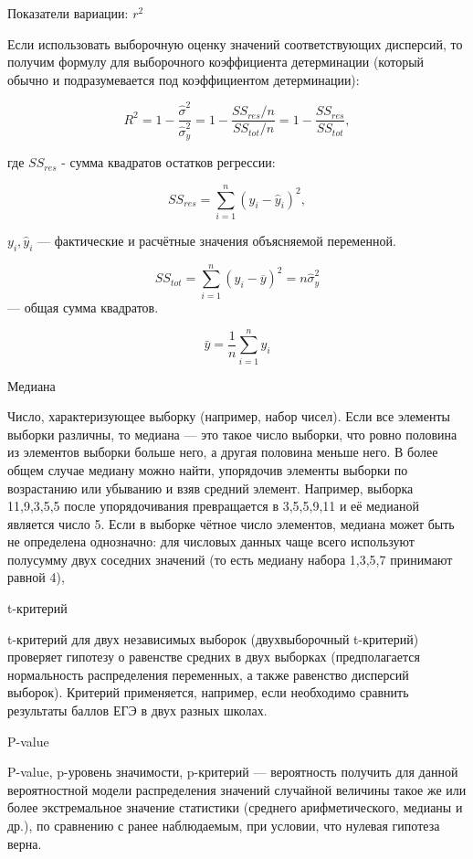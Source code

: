\documentclass{beamer}
\begin{document}
\begin{frame}{Показатели вариации: $r^2$}

 Если использовать выборочную оценку значений соответствующих дисперсий, то получим формулу для выборочного коэффициента детерминации (который обычно и подразумевается под коэффициентом детерминации):

$$R^2 =1-\frac {\hat{\sigma}^2}{\hat{\sigma}^2_y}=1-\frac {SS_{res}/n}{SS_{tot}/n}=1-\frac {SS_{res}} {SS_{tot}},$$

где $SS_{res}$ -   сумма квадратов остатков регрессии:

$$SS_{res}=\sum^n_{i=1} (y_i-\hat y_i)^2, $$ 

$y_i,\hat y_i$ — фактические и расчётные значения объясняемой переменной.

$$SS_{tot}=\sum^n_{i=1} (y_i-\overline y)^2=n \hat \sigma^2_y$$ — общая сумма квадратов.

$$\bar{y}=\frac{1}{n}\sum_{i=1}^n y_i$$

\end{frame}

\begin{frame}{Медиана}

Число, характеризующее выборку (например, набор чисел). Если все элементы выборки различны, то медиана — это такое число выборки, 
что ровно половина из элементов выборки больше него, а другая половина меньше него. 
В более общем случае медиану можно найти, упорядочив элементы выборки по возрастанию или 
убыванию и взяв средний элемент. Например, выборка 11,9,3,5,5 после упорядочивания 
превращается в 3,5,5,9,11 и её медианой является число 5. Если в выборке чётное число 
элементов, медиана может быть не определена однозначно: для числовых данных чаще всего используют 
полусумму двух соседних значений (то есть медиану набора 1,3,5,7 принимают равной 4), 

\end{frame}


\begin{frame}{t-критерий}


t-критерий для двух независимых выборок (двухвыборочный t-критерий) 
проверяет гипотезу о равенстве средних в двух выборках 
(предполагается нормальность распределения переменных, а также равенство дисперсий выборок).
 Критерий применяется, например, если необходимо сравнить результаты баллов ЕГЭ в двух разных школах. 

\end{frame}

\begin{frame}{P-value}

P-value,  p-уровень значимости, p-критерий — вероятность получить 
для данной вероятностной модели распределения значений случайной величины 
такое же или более экстремальное 
значение статистики (среднего арифметического, медианы и др.), 
по сравнению с ранее наблюдаемым, при условии, что нулевая гипотеза верна. 

\end{frame}
\end{document}
